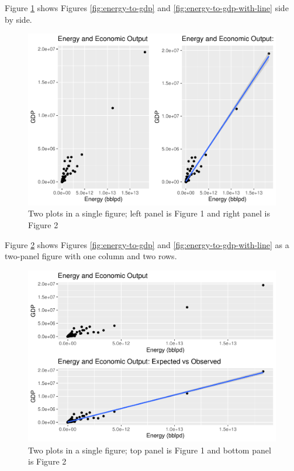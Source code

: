 \documentclass[]{elsarticle} %
\makeatletter
\def\maxwidth{\ifdim\Gin@nat@width>\linewidth\linewidth
\else\Gin@nat@width\fi}
\let\Oldincludegraphics\includegraphics
\renewcommand{\includegraphics}[1]{\Oldincludegraphics[width=\maxwidth]{#1}}
\makeatother
\begin{document}
Figure \ref{fig:right-left-panel-plot} shows Figures
\ref{fig:energy-to-gdp} and \ref{fig:energy-to-gdp-with-line} side by
side.

\begin{figure}
\centering
\includegraphics{Elsevier-Template_files/figure-latex/fig-right-left-panel-plot-1.pdf}
\caption{\label{fig:right-left-panel-plot} Two plots in a single figure;
left panel is Figure 1 and right panel is Figure 2}
\end{figure}

Figure \ref{fig:top-bottom-panel-plot} shows Figures
\ref{fig:energy-to-gdp} and \ref{fig:energy-to-gdp-with-line} as a
two-panel figure with one column and two rows.

\begin{figure}
\centering
\includegraphics{Elsevier-Template_files/figure-latex/fig-top-bottom-panel-plot-1.pdf}
\caption{\label{fig:top-bottom-panel-plot} Two plots in a single figure;
top panel is Figure 1 and bottom panel is Figure 2}
\end{figure}
\end{document}
